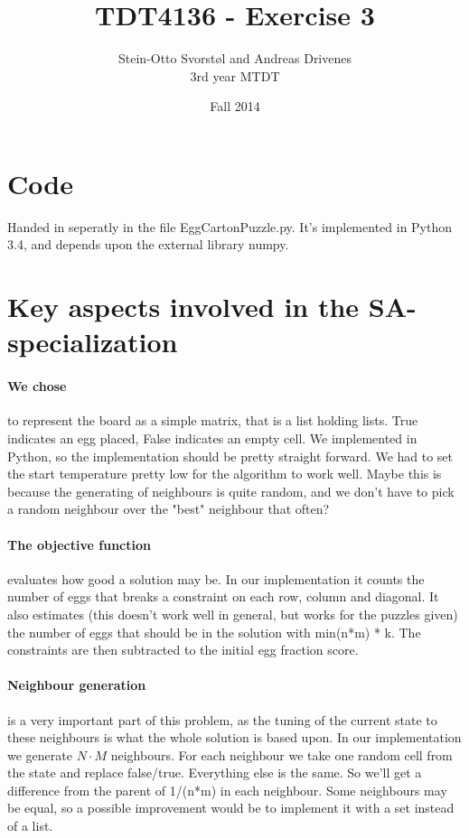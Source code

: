 \documentclass[11pt,a4paper]{article}
\author{Stein-Otto Svorstøl and Andreas Drivenes
\\3rd year MTDT}
\title{TDT4136 - Exercise 3}
\date{Fall 2014}
\begin{document}
\maketitle
\section{Code}
Handed in seperatly in the file EggCartonPuzzle.py. It's implemented in Python 3.4, and depends upon the external library numpy.

\section{Key aspects involved in the SA-specialization}
\paragraph{We chose} to represent the board as a simple matrix, that is a list holding lists. True indicates an egg placed, False indicates an empty cell. We implemented in Python, so the implementation should be pretty straight forward. We had to set the start temperature pretty low for the algorithm to work well. Maybe this is because the generating of neighbours is quite random, and we don't have to pick a random neighbour over the "best" neighbour that often?

\paragraph{The objective function} evaluates how good a solution may be. In our implementation it counts the number of eggs that breaks a constraint on each row, column and diagonal. It also estimates (this doesn't work well in general, but works for the puzzles given) the number of eggs that should be in the solution with min(n*m) * k. The constraints are then subtracted to the initial egg fraction score.

\paragraph{Neighbour generation} is a very important part of this problem, as the tuning of the current state to these neighbours is what the whole solution is based upon. In our implementation we generate \begin{math}N\cdot M\end{math} neighbours. For each neighbour we take one random cell from the state and replace false/true. Everything else is the same. So we'll get a difference from the parent of 1/(n*m) in each neighbour. Some neighbours may be equal, so a possible improvement would be to implement it with a set instead of a list.
\end{document}
